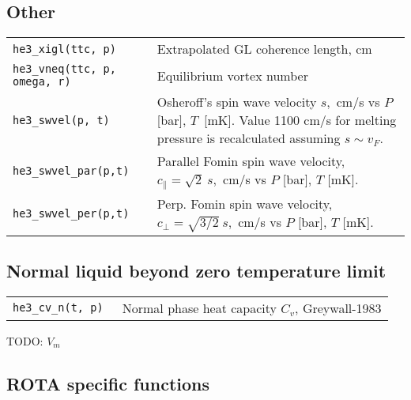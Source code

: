 \documentclass[a4paper]{article}
\begin{document}
\subsection*{Other}

\medskip
\noindent\begin{tabular}{lp{11cm}}
\tt he3\_xigl(ttc, p) & Extrapolated GL coherence length, cm\\
\tt he3\_vneq(ttc, p, omega, r) & Equilibrium vortex number\\

\tt he3\_swvel(p, t) & Osheroff's spin wave velocity $s$,~cm/s
                      vs $P$ [bar], $T$~[mK]. Value 1100 cm/s for
                      melting pressure is recalculated assuming $s\sim v_F$.\\
\tt he3\_swvel\_par(p,t) & Parallel Fomin spin wave velocity,\newline
                          $c_\parallel = \sqrt{2}\ s$,~cm/s vs $P$ [bar], $T$ [mK].\\
\tt he3\_swvel\_per(p,t) & Perp. Fomin spin wave velocity,\newline
                          $c_\perp = \sqrt{3/2}\ s$,~cm/s vs $P$ [bar], $T$ [mK].\\

\end{tabular}
\medskip

\subsection*{Normal liquid beyond zero temperature limit}

\medskip
\noindent\begin{tabular}{lp{11cm}}
\tt he3\_cv\_n(t, p)  &Normal phase heat capacity $C_v$, {\small Greywall-1983}\\

\end{tabular}
\medskip

TODO: $V_m$

\subsection*{ROTA specific functions}
\end{document}
